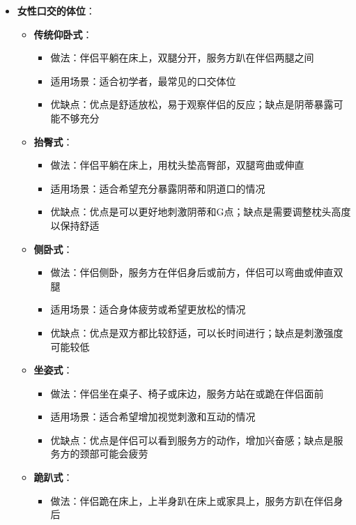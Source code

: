 \documentclass[12pt,UTF8]{ctexbook}
\begin{document}
\begin{itemize}
\begin{itemize}
\begin{itemize}
      \item 优缺点：优点是可以同时获得快感；缺点是可能难以专注于对方的感受
      \end{itemize}
    \end{itemize}
  \item \textbf{女性口交的体位}：
    \begin{itemize}
    \item \textbf{传统仰卧式}：
      \begin{itemize}
      \item 做法：伴侣平躺在床上，双腿分开，服务方趴在伴侣两腿之间
      \item 适用场景：适合初学者，最常见的口交体位
      \item 优缺点：优点是舒适放松，易于观察伴侣的反应；缺点是阴蒂暴露可能不够充分
      \end{itemize}
    \item \textbf{抬臀式}：
      \begin{itemize}
      \item 做法：伴侣平躺在床上，用枕头垫高臀部，双腿弯曲或伸直
      \item 适用场景：适合希望充分暴露阴蒂和阴道口的情况
      \item 优缺点：优点是可以更好地刺激阴蒂和G点；缺点是需要调整枕头高度以保持舒适
      \end{itemize}
    \item \textbf{侧卧式}：
      \begin{itemize}
      \item 做法：伴侣侧卧，服务方在伴侣身后或前方，伴侣可以弯曲或伸直双腿
      \item 适用场景：适合身体疲劳或希望更放松的情况
      \item 优缺点：优点是双方都比较舒适，可以长时间进行；缺点是刺激强度可能较低
      \end{itemize}
    \item \textbf{坐姿式}：
      \begin{itemize}
      \item 做法：伴侣坐在桌子、椅子或床边，服务方站在或跪在伴侣面前
      \item 适用场景：适合希望增加视觉刺激和互动的情况
      \item 优缺点：优点是伴侣可以看到服务方的动作，增加兴奋感；缺点是服务方的颈部可能会疲劳
      \end{itemize}
    \item \textbf{跪趴式}：
      \begin{itemize}
      \item 做法：伴侣跪在床上，上半身趴在床上或家具上，服务方趴在伴侣身后

\end{itemize}
\end{itemize}
\end{itemize}
\end{document}
